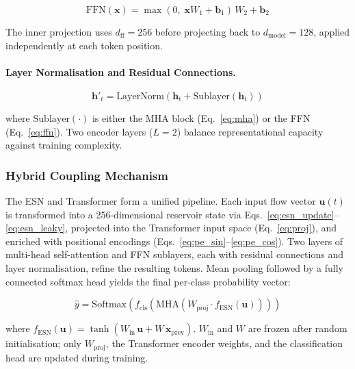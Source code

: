 \documentclass[5p,times]{elsarticle}
\begin{document}
	\begin{equation}
		\mathrm{FFN}(\mathbf{x}) =
		\max(0,\; \mathbf{x}W_1 + \mathbf{b}_1)\,W_2 + \mathbf{b}_2
		\label{eq:ffn}
	\end{equation}
	
	The inner projection uses $d_{\mathrm{ff}} = 256$ before projecting
	back to $d_{\mathrm{model}} = 128$, applied independently at each
	token position.
	
	\paragraph{Layer Normalisation and Residual Connections.}
	
	\begin{equation}
		\mathbf{h}'_t =
		\mathrm{LayerNorm}\!\left(\mathbf{h}_t +
		\mathrm{Sublayer}(\mathbf{h}_t)\right)
		\label{eq:layernorm}
	\end{equation}
	
	where $\mathrm{Sublayer}(\cdot)$ is either the MHA block
	(Eq.~\eqref{eq:mha}) or the FFN (Eq.~\eqref{eq:ffn}). Two encoder
	layers ($L = 2$) balance representational capacity against training
	complexity.
	
	\subsubsection{Hybrid Coupling Mechanism}
	
	The ESN and Transformer form a unified pipeline. Each input flow
	vector $\mathbf{u}(t)$ is transformed into a 256-dimensional
	reservoir state via Eqs.~\eqref{eq:esn_update}--\eqref{eq:esn_leaky},
	projected into the Transformer input space (Eq.~\eqref{eq:proj}), and
	enriched with positional encodings
	(Eqs.~\eqref{eq:pe_sin}--\eqref{eq:pe_cos}). Two layers of multi-head
	self-attention and FFN sublayers, each with residual connections and
	layer normalisation, refine the resulting tokens. Mean pooling
	followed by a fully connected softmax head yields the final per-class
	probability vector:
	
	\begin{equation}
		\hat{y} = \mathrm{Softmax}\!\!\left(
		f_{\mathrm{cls}}\!\!\left(
		\mathrm{MHA}\!\left(
		W_{\mathrm{proj}} \cdot f_{\mathrm{ESN}}(\mathbf{u})
		\right)
		\right)
		\right)
		\label{eq:endtoend}
	\end{equation}
	
	where $f_{\mathrm{ESN}}(\mathbf{u}) = \tanh(W_{\mathrm{in}}\,
	\mathbf{u} + W\,\mathbf{x}_{\mathrm{prev}})$. $W_{\mathrm{in}}$ and
	$W$ are frozen after random initialisation; only $W_{\mathrm{proj}}$,
	the Transformer encoder weights, and the classification head are
	updated during training.
	
\end{document}
